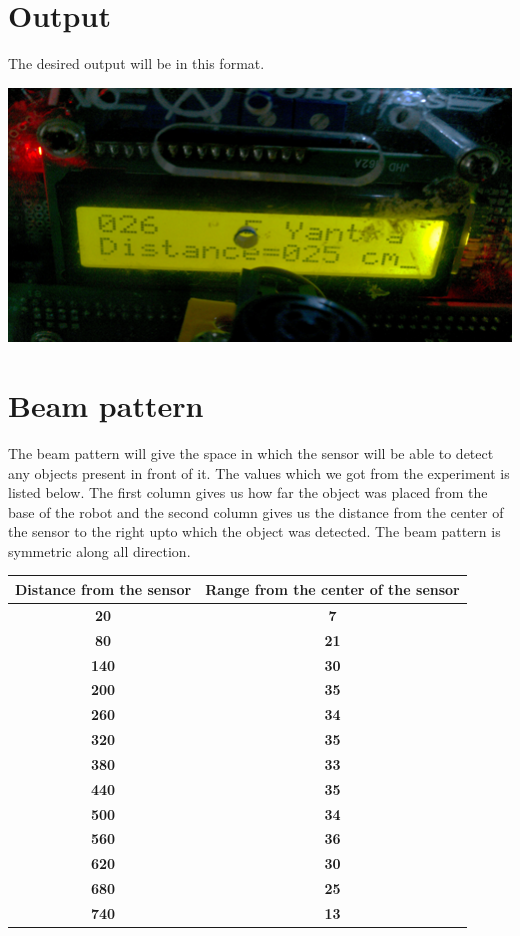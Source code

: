 \documentclass[a4paper,29.6pt]{article}
\begin{document}
\section{Output}
\begin{small}
The desired output will be in this format.
\begin{center}
\includegraphics[scale=0.75]{5}
\end{center}
\end{small}

\section{Beam pattern}
The beam pattern will give the space in which the sensor will be able to detect any objects present in front of it. The values which we got from the experiment is listed below. The first column gives us  how far the object was placed from the base of the robot and the second column gives us the distance from the center of the sensor to the right upto which the object was detected. The beam pattern is symmetric along all direction.

\begin{table}[!h]

\TINY
\begin{tabular}{c c}
\toprule
\textbf{Distance from the sensor}&\textbf{Range from the center of the sensor}\\
\midrule
\textbf{20}&\textbf{7}\\
\textbf{80}&\textbf{21}\\
\textbf{140}&\textbf{30}\\
\textbf{200}&\textbf{35}\\
\textbf{260}&\textbf{34}\\
\textbf{320}&\textbf{35}\\
\textbf{380}&\textbf{33}\\
\textbf{440}&\textbf{35}\\
\textbf{500}&\textbf{34}\\
\textbf{560}&\textbf{36}\\
\textbf{620}&\textbf{30}\\
\textbf{680}&\textbf{25}\\
\textbf{740}&\textbf{13}\\
\bottomrule
\end{tabular}
\end{table}
\end{document}
